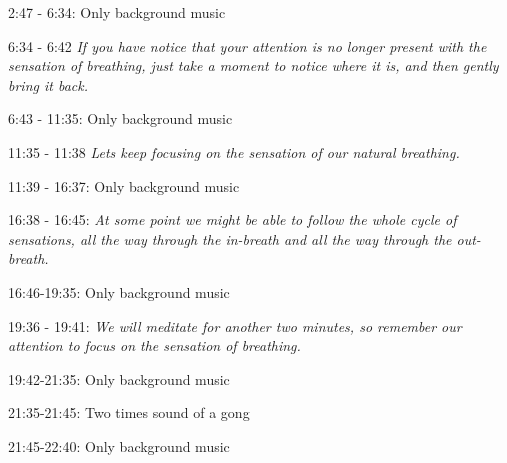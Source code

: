 2:47 - 6:34: Only background music

6:34 - 6:42 \textit{If you have notice that your attention is no longer present with the sensation of breathing, just take a moment to notice where it is, and then gently bring it back. }

6:43 - 11:35: Only background music

11:35 - 11:38 \textit{Lets keep focusing on the sensation of our natural breathing.}

11:39 - 16:37: Only background music

16:38 - 16:45: \textit{At some point we might be able to follow the whole cycle of sensations, all the way through the in-breath and all the way through the out-breath. }

16:46-19:35: Only background music

19:36 - 19:41: \textit{We will meditate for another two minutes, so remember our attention to focus on the sensation of breathing.}

19:42-21:35: Only background music 

21:35-21:45: Two times sound of a gong  

21:45-22:40: Only background music 